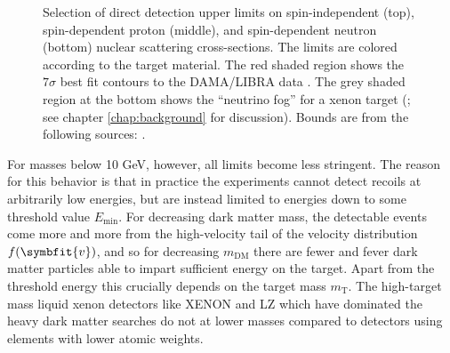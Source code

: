 \documentclass[b5paper, 10pt, twoside]{book}
\newcommand{\annotatestyle}{\sbsfstyle}
\renewcommand{\vec}[1]{\symbfit{#1}}
\newcommand{\plotlineannotation}[1]{{\scriptsize\annotatestyle #1}}
\newcommand{\xenoncolor}{scp-orange-dark-1}
\newcommand{\nufogcolor}{scp-grey-light-2}
\begin{document}
\begin{figure}
\vspace*{-1.0pc}
\caption{Selection of direct detection upper limits on spin-independent (top), spin-dependent proton (middle), and spin-dependent neutron (bottom) nuclear scattering cross-sections. The limits are colored according to the target material. The red shaded region shows the $7\sigma$ best fit contours to the DAMA/LIBRA data \parencite{SavageEtAl2009}. The grey shaded region at the bottom shows the ``neutrino fog'' for a xenon target (\textcite{OHare2021}; see chapter \ref{chap:background} for discussion). Bounds are from the following sources: \textcites{DarkSide2023, XENONnT2023, CDEX2019, PandaX2021, DAMIC2020, LZ2024, CRESSTIII2019, COSINE1002018, CDMSlite2018, PICO602019, XENON2019a}.}
\label{fig:dd-reach}
\end{figure}

For masses below 10 GeV, however, all limits become less stringent. The reason for this behavior is that in practice the experiments cannot detect recoils at arbitrarily low energies, but are instead limited to energies down to some threshold value $E_\text{min}$. For decreasing dark matter mass, the detectable events come more and more from the high-velocity tail of the velocity distribution $f(\vec{v})$, and so for decreasing $m_\text{DM}$ there are fewer and fever dark matter particles able to impart sufficient energy on the target. Apart from the threshold energy this crucially depends on the target mass $m_\text{T}$. The high-target mass liquid xenon detectors like XENON and LZ which have dominated the heavy dark matter searches do not at lower masses compared to detectors using elements with lower atomic weights.
\end{document}
